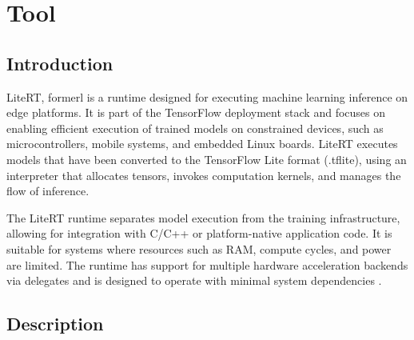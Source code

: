 %
%



%




%






\chapter{Tool  }

\section{Introduction}



LiteRT, formerl is a runtime designed for executing machine learning inference on edge platforms. It is part of the TensorFlow deployment stack and focuses on enabling efficient execution of trained models on constrained devices, such as microcontrollers, mobile systems, and embedded Linux boards. LiteRT executes models that have been converted to the TensorFlow Lite format (.tflite), using an interpreter that allocates tensors, invokes computation kernels, and manages the flow of inference.



\bigskip



The LiteRT runtime separates model execution from the training infrastructure, allowing for integration with C/C++ or platform-native application code. It is suitable for systems where resources such as RAM, compute cycles, and power are limited. The runtime has support for multiple hardware acceleration backends via delegates and is designed to operate with minimal system dependencies \cite{Google:2025}.



\section{Description}



